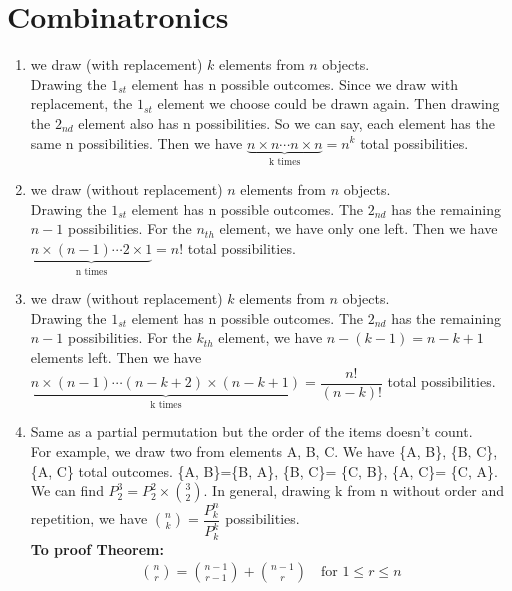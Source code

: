 \documentclass[12pt,a4paper,titlepage]{article}
\begin{document}
%
\section{Combinatronics}

\begin{enumerate}
\item we draw (with replacement) $k$ elements from $n$ objects.\\
Drawing the $1_{st}$ element has n possible outcomes. Since we draw with replacement, the $1_{st}$ element we choose could be drawn again. Then drawing the $2_{nd}$ element also has n possibilities. So we can say, each element has the same n possibilities. Then we have $\underbrace{n\times n \cdots n\times n}_{\text{k times}} = n^k$ total possibilities.

\item we draw (without replacement) $n$ elements from $n$ objects.\\
Drawing the $1_{st}$ element has n possible outcomes. The $2_{nd}$ has the remaining $n-1$ possibilities. For the $n_{th}$ element, we have only one left. Then we have $\underbrace{n\times (n-1) \cdots 2\times 1}_{\text{n times}} = n!$ total possibilities.
\item we draw (without replacement) $k$ elements from $n$ objects.\\
Drawing the $1_{st}$ element has n possible outcomes. The $2_{nd}$ has the remaining $n-1$ possibilities. For the $k_{th}$ element, we have $n-(k-1)=n-k+1$ elements left. Then we have $\underbrace{n\times (n-1) \cdots (n-k+2)\times (n-k+1)}_{\text{k times}}=\dfrac{n!}{(n-k)!}$ total possibilities.
\item Same as a partial permutation but the order of the items doesn't count.\\
For example, we draw two from elements A, B, C. We have \{A, B\}, \{B, C\}, \{A, C\} total outcomes. \{A, B\}=\{B, A\},  \{B, C\}= \{C, B\},  \{A, C\}= \{C, A\}. We can find $P_2^3=P_2^2 \times {3 \choose 2}$. In general, drawing k from n without order and repetition, we have ${n \choose k}=\dfrac{P^n_k}{P^k_k} $ possibilities.\\

\textbf{To proof Theorem:}
\begin{align}
{n \choose r}={n-1 \choose r-1}+{n-1 \choose r} \quad \text{for } 1\leq r\leq n
\end{align}


\end{enumerate}
\end{document}
